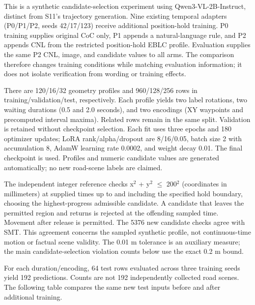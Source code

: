 \documentclass[11pt,a4paper]{article}
\begin{document}
This is a synthetic candidate-selection experiment using Qwen3-VL-2B-Instruct, distinct from S11's trajectory generation. Nine existing temporal adapters (P0/P1/P2, seeds 42/17/123) receive additional position-hold training. P0 training supplies original CoC only, P1 appends a natural-language rule, and P2 appends CNL from the restricted position-hold EBLC profile. Evaluation supplies the same P2 CNL, image, and candidate values to all arms. The comparison therefore changes training conditions while matching evaluation information; it does not isolate verification from wording or training effects.\par

There are 120/16/32 geometry profiles and 960/128/256 rows in training/validation/test, respectively. Each profile yields two label rotations, two waiting durations (0.5 and 2.0 seconds), and two encodings (XY waypoints and precomputed interval maxima). Related rows remain in the same split. Validation is retained without checkpoint selection. Each fit uses three epochs and 180 optimizer updates; LoRA rank/alpha/dropout are 8/16/0.05, batch size 2 with accumulation 8, AdamW learning rate 0.0002, and weight decay 0.01. The final checkpoint is used. Profiles and numeric candidate values are generated automatically; no new road-scene labels are claimed.\par

The independent integer reference checks x$^2$ + y$^2$ $\leq$ 200$^2$ (coordinates in millimeters) at supplied times up to and including the specified hold boundary, choosing the highest-progress admissible candidate. A candidate that leaves the permitted region and returns is rejected at the offending sampled time. Movement after release is permitted. The 5376 new candidate checks agree with SMT. This agreement concerns the sampled synthetic profile, not continuous-time motion or factual scene validity. The 0.01 m tolerance is an auxiliary measure; the main candidate-selection violation counts below use the exact 0.2 m bound.\par

For each duration/encoding, 64 test rows evaluated across three training seeds yield 192 predictions. Counts are not 192 independently collected road scenes. The following table compares the same new test inputs before and after additional training.\par
\end{document}
